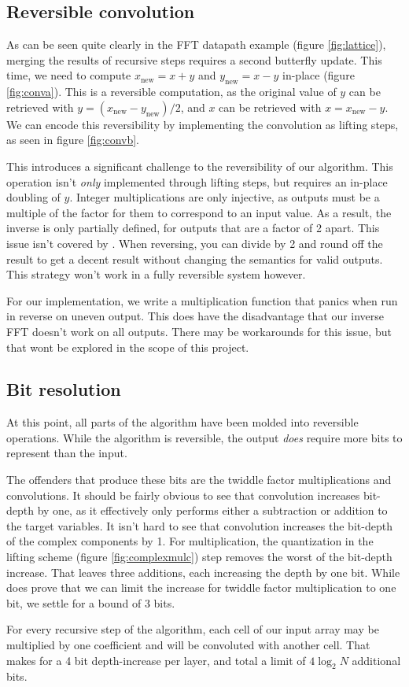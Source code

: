 

\subsection{Reversible convolution}
As can be seen quite clearly in the FFT datapath example (figure \ref{fig:lattice}),
merging the results of recursive steps requires a second butterfly update.
This time, we need to compute
$x_\text{new} = x + y$ and $y_\text{new} = x - y$ in-place (figure \ref{fig:conva}).
This is a reversible computation, as the original value of $y$ can be retrieved with
$y = (x_\text{new} - y_\text{new})/2$, and $x$ can be retrieved with $x = x_\text{new} - y$.
We can encode this reversibility by implementing the convolution as lifting steps,
as seen in figure \ref{fig:convb}.



This introduces a significant challenge to the reversibility of our algorithm.
This operation isn't \textit{only} implemented through lifting steps,
but requires an in-place doubling of $y$.
Integer multiplications are only injective,
as outputs must be a multiple of the factor for them to correspond to an input value.
As a result, the inverse is only partially defined, for outputs that are a factor of 2 apart.
This issue isn't covered by \cite{intfft}.
When reversing, you can divide by 2 and round off the result to get a decent result
without changing the semantics for valid outputs.
This strategy won't work in a fully reversible system however.

For our implementation,
we write a multiplication function that panics when run in reverse on uneven output.
This does have the disadvantage that our inverse FFT doesn't work on all outputs.
There may be workarounds for this issue,
but that wont be explored in the scope of this project.

\subsection{Bit resolution}
At this point,
all parts of the algorithm have been molded into reversible operations.
While the algorithm is reversible,
the output \textit{does} require more bits to represent than the input.

The offenders that produce these bits are the twiddle factor multiplications and convolutions.
It should be fairly obvious to see that convolution increases bit-depth by one,
as it effectively only performs either a subtraction or addition to the target variables.
It isn't hard to see that convolution increases the bit-depth of the complex components by 1.
For multiplication, the quantization in the lifting scheme (figure \ref{fig:complexmulc})
step removes the worst of the bit-depth increase.
That leaves three additions, each increasing the depth by one bit.
While \cite{intfft} does prove
that we can limit the increase for twiddle factor multiplication to one bit,
we settle for a bound of 3 bits.

For every recursive step of the algorithm,
each cell of our input array may be multiplied by one coefficient
and will be convoluted with another cell.
That makes for a 4 bit depth-increase per layer, and total a limit of $4 \log_2 N$ additional bits.
